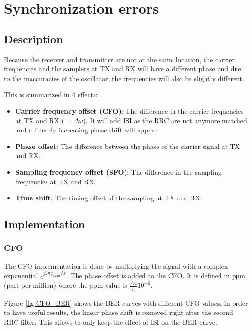 \setcounter{secnumdepth}{-1}

\chapter{Synchronization errors}

\section{Description}

Because the receiver and transmitter are not at the same location, the carrier frequencies and the samplers at TX and RX will have a different phase and due to the inaccuracies of the oscillator, the frequencies will also be slightly different. \par
This is summarized in 4 effects:
\begin{itemize}
    \item \textbf{Carrier frequency offset (CFO)}: The difference in the carrier frequencies at TX and RX ($=\Delta \omega$). It will add ISI as the RRC are not anymore matched and a linearly increasing phase shift will appear.
    \item \textbf{Phase offset}: The difference between the phase of the carrier signal at TX and RX.
    \item \textbf{Sampling frequency offset (SFO)}: The difference in the sampling frequencies at TX and RX.
    \item \textbf{Time shift}: The timing offset of the sampling at TX and RX.
\end{itemize}

\section{Implementation}

\subsection{CFO}
The CFO implementation is done by multiplying the signal with a complex exponential $e^{j2\pi \phi_{\text{ppm}}f_c t}$. The phase offset is added to the CFO. It is defined in ppm (part per million) where the ppm value is $\frac{\Delta\omega}{f_c} 10^{-6}$. \par
Figure \ref{fig:CFO_BER} shows the BER curves with different CFO values. In order to have useful results, the linear phase shift is removed right after the second RRC filter. This allows to only keep the effect of ISI on the BER curve.

